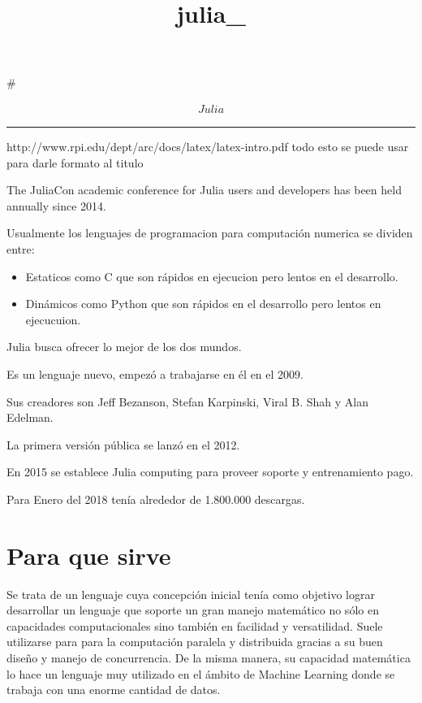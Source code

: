 \documentclass[11pt]{article}
\title{julia\_}
\begin{document}
    
    
    \maketitle
    
    

    
    \#

\begin{align}  Julia  \end{align}

\begin{center}\rule{0.5\linewidth}{\linethickness}\end{center}

    http://www.rpi.edu/dept/arc/docs/latex/latex-intro.pdf todo esto se
puede usar para darle formato al titulo

    

    The JuliaCon academic conference for Julia users and developers has been
held annually since 2014.

    Usualmente los lenguajes de programacion para computación numerica se
dividen entre:

\begin{itemize}
\item
  Estaticos como C que son rápidos en ejecucion pero lentos en el
  desarrollo.
\item
  Dinámicos como Python que son rápidos en el desarrollo pero lentos en
  ejecucuion.
\end{itemize}

Julia busca ofrecer lo mejor de los dos mundos.

Es un lenguaje nuevo, empezó a trabajarse en él en el 2009.

Sus creadores son Jeff Bezanson, Stefan Karpinski, Viral B. Shah y Alan
Edelman.

La primera versión pública se lanzó en el 2012.

En 2015 se establece Julia computing para proveer soporte y
entrenamiento pago.

Para Enero del 2018 tenía alrededor de 1.800.000 descargas.

    \section{Para que sirve}\label{para-que-sirve}

    Se trata de un lenguaje cuya concepción inicial tenía como objetivo
lograr desarrollar un lenguaje que soporte un gran manejo matemático no
sólo en capacidades computacionales sino también en facilidad y
versatilidad. Suele utilizarse para para la computación paralela y
distribuida gracias a su buen diseño y manejo de concurrencia. De la
misma manera, su capacidad matemática lo hace un lenguaje muy utilizado
en el ámbito de Machine Learning donde se trabaja con una enorme
cantidad de datos.
\end{document}
